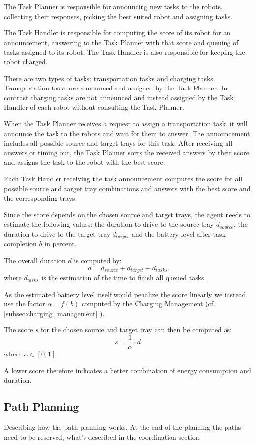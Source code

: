 \documentclass[journal]{IEEEtran}
\newcommand{\compref}[1]{\autoref{#1} \nameref{#1}}
\begin{document}
The Task Planner is responsible for announcing new tasks to the robots, collecting their responses, picking the best suited robot and assigning tasks.

The Task Handler is responsible for computing the score of its robot for an announcement, answering to the Task Planner with that score and queuing of tasks assigned to its robot. The Task Handler is also responsible for keeping the robot charged.

There are two types of tasks: transportation tasks and charging tasks. Transportation tasks are announced and assigned by the Task Planner. In contrast charging tasks are not announced and instead assigned by the Task Handler of each robot without consulting the Task Planner.

When the Task Planner receives a request to assign a transportation task, it will announce the task to the robots and wait for them to answer.
The announcement includes all possible source and target trays for this task.
After receiving all answers or timing out, the Task Planner sorts the received answers by their score and assigns the task to the robot with the best score.

Each Task Handler receiving the task announcement computes the score for all possible source and target tray combinations and answers with the best score and the corresponding trays.

Since the score depends on the chosen source and target trays, the agent needs to estimate the following values: the duration to drive to the source tray $d_{source}$, the duration to drive to the target tray $d_{target}$ and the battery level after task completion $b$ in percent.

The overall duration $d$ is computed by:
$$d = d_{source} + d_{target} + d_{tasks}$$
where $d_{tasks}$ is the estimation of the time to finish all queued tasks.

As the estimated battery level itself would penalize the score linearly we instead use the factor $\alpha = f(b)$ computed by the Charging Management (cf. \compref{subsec:charging_management}).

The score $s$ for the chosen source and target tray can then be computed as:
$$ s = \frac{1}{\alpha} \cdot d$$
where $\alpha \in [0, 1]$.

A lower score therefore indicates a better combination of energy consumption and duration.


\subsection{Path Planning}
\label{subsec:path_planning}
Describing how the path planning works. At the end of the planning the paths need to be reserved, what's described in the coordination section.
\end{document}
